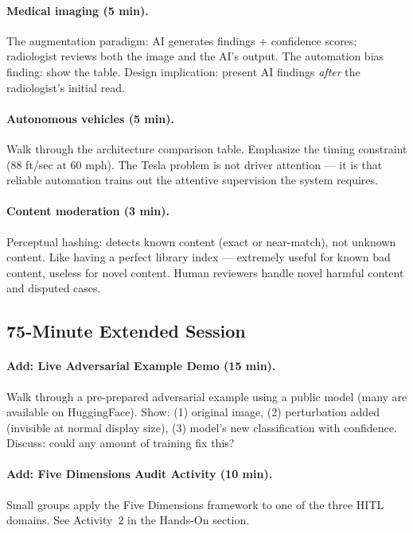 \paragraph{Medical imaging (5 min).}
The augmentation paradigm: AI generates findings + confidence scores; radiologist reviews both the image and the AI's output. The automation bias finding: show the table. Design implication: present AI findings \emph{after} the radiologist's initial read.

\paragraph{Autonomous vehicles (5 min).}
Walk through the architecture comparison table. Emphasize the timing constraint (88 ft/sec at 60 mph). The Tesla problem is not driver attention --- it is that reliable automation trains out the attentive supervision the system requires.

\paragraph{Content moderation (3 min).}
Perceptual hashing: detects known content (exact or near-match), not unknown content. Like having a perfect library index --- extremely useful for known bad content, useless for novel content. Human reviewers handle novel harmful content and disputed cases.

\subsection{75-Minute Extended Session}

\paragraph{Add: Live Adversarial Example Demo (15 min).}
Walk through a pre-prepared adversarial example using a public model (many are available on HuggingFace). Show: (1) original image, (2) perturbation added (invisible at normal display size), (3) model's new classification with confidence. Discuss: could any amount of training fix this?

\paragraph{Add: Five Dimensions Audit Activity (10 min).}
Small groups apply the Five Dimensions framework to one of the three HITL domains. See Activity~2 in the Hands-On section.

